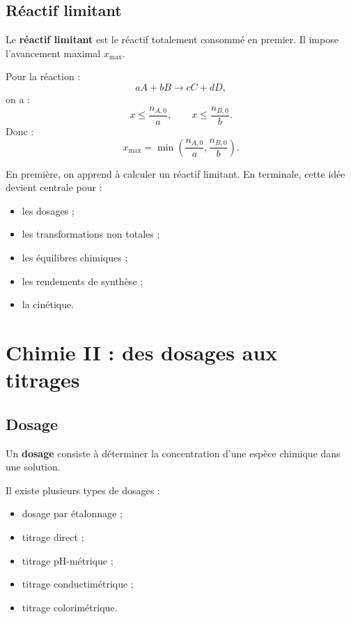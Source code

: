 \documentclass[11pt,a4paper]{article}
\begin{document}
\subsection{Réactif limitant}

\begin{definition}
Le \textbf{réactif limitant} est le réactif totalement consommé en premier. Il impose l'avancement maximal $x_{\max}$.
\end{definition}

Pour la réaction :
\[
aA+bB\longrightarrow cC+dD,
\]
on a :
\[
x\leq \frac{n_{A,0}}{a},
\qquad
x\leq \frac{n_{B,0}}{b}.
\]
Donc :
\[
x_{\max}=\min\left(\frac{n_{A,0}}{a},\frac{n_{B,0}}{b}\right).
\]

\begin{transition}
En première, on apprend à calculer un réactif limitant.  
En terminale, cette idée devient centrale pour :
\begin{itemize}
  \item les dosages ;
  \item les transformations non totales ;
  \item les équilibres chimiques ;
  \item les rendements de synthèse ;
  \item la cinétique.
\end{itemize}
\end{transition}

\section{Chimie II : des dosages aux titrages}

\subsection{Dosage}

\begin{definition}
Un \textbf{dosage} consiste à déterminer la concentration d'une espèce chimique dans une solution.
\end{definition}

Il existe plusieurs types de dosages :
\begin{itemize}
  \item dosage par étalonnage ;
  \item titrage direct ;
  \item titrage pH-métrique ;
  \item titrage conductimétrique ;
  \item titrage colorimétrique.
\end{itemize}
\end{document}
